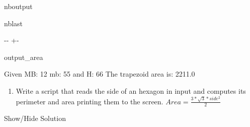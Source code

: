 \documentclass[letterpaper,10pt,english]{sphinxmanual}
\begin{document}
\begin{sphinxuseclass}{nboutput}
\begin{sphinxuseclass}{nblast}
{

\kern-\sphinxverbatimsmallskipamount\kern-\baselineskip
\kern+\FrameHeightAdjust\kern-\fboxrule
\vspace{\nbsphinxcodecellspacing}

\begin{sphinxuseclass}{output_area}
\begin{sphinxuseclass}{}


\begin{sphinxVerbatim}[commandchars=\\\{\}]
Given MB: 12  mb: 55  and H: 66
The trapezoid area is:  2211.0
\end{sphinxVerbatim}



\end{sphinxuseclass}
\end{sphinxuseclass}
}

\end{sphinxuseclass}
\end{sphinxuseclass}

\begin{enumerate}
%
\setcounter{enumi}{6}
\item {} 
\sphinxAtStartPar
Write a script that reads the side of an hexagon in input and computes its perimeter and area printing them to the screen.  \(Area = \frac{3*\sqrt{3}*side^{2}}{2}\)

\end{enumerate}



\sphinxAtStartPar
Show/Hide Solution
\end{document}
